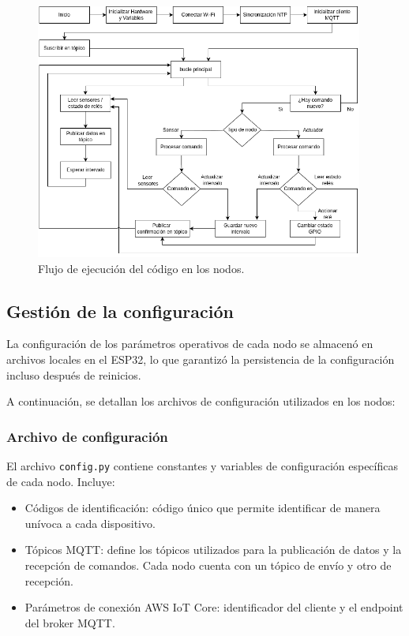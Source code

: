 \begin{figure}[H]
    \centering
    \includegraphics[width=0.96\textwidth]{./Images/30_flujo_ppal_nodos.png}
    \caption{Flujo de ejecución del código en los nodos.}
    \label{fig:flujo_nodos}
\end{figure}


\subsection{Gestión de la configuración}

La configuración de los parámetros operativos de cada nodo se almacenó en
archivos locales en el ESP32, lo que garantizó la persistencia de la
configuración incluso después de reinicios.

A continuación, se detallan los archivos de configuración utilizados en los
nodos:

\subsubsection{Archivo de configuración}

El archivo \texttt{config.py} contiene constantes y variables de configuración
específicas de cada nodo. Incluye:
\begin{itemize}
    \item Códigos de identificación: código único que permite identificar de manera
          unívoca a cada dispositivo.
    \item Tópicos MQTT: define los tópicos utilizados para la publicación de datos y la
          recepción de comandos. Cada nodo cuenta con un tópico de envío y otro de
          recepción.
    \item Parámetros de conexión AWS IoT Core: identificador del cliente y el endpoint
          del broker MQTT.
\end{itemize}


